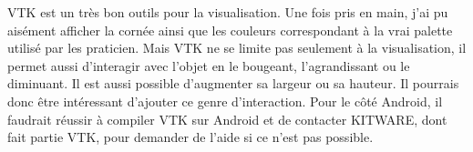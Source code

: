\documentclass[a4paper,12pt]{article}
\begin{document}
  VTK est un très bon outils pour la visualisation. Une fois pris en main, j'ai pu aisément afficher la cornée ainsi que les couleurs correspondant à la vrai palette utilisé par les praticien. Mais VTK ne se limite pas seulement à la visualisation, il permet aussi d'interagir avec l'objet en le bougeant, l'agrandissant ou le diminuant. Il est aussi possible d'augmenter sa largeur ou sa hauteur. Il pourrais donc \^etre intéressant d'ajouter ce genre d'interaction. Pour le côté Android, il faudrait réussir à compiler VTK sur Android et de contacter KITWARE, dont fait partie VTK, pour demander de l'aide si ce n'est pas possible.

\newpage


\end{document}
